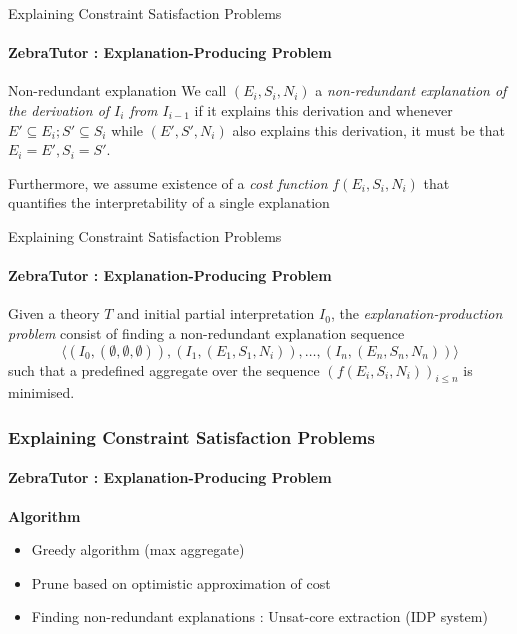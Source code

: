 \documentclass{beamer}
\begin{document}
\begin{frame}{\small{Explaining Constraint Satisfaction Problems}}
    \framesubtitle{ZebraTutor : Explanation-Producing Problem}
    \begin{block}{Non-redundant explanation}
        We call $(E_i,S_i,N_i)$ a \emph{non-redundant explanation of  the derivation of $I_i$ from $I_{i-1}$} if it explains this derivation and whenever $E'\subseteq E_i; S'\subseteq S_i$ while $(E',S',N_i)$ also explains this derivation, it must be that $E_i=E', S_i=S'$.
    \end{block}
    \pause
    Furthermore, we assume existence of a \emph{cost function} $f(E_i,S_i,N_i)$ that quantifies the interpretability of a single explanation
\end{frame}


\begin{frame}{\small{Explaining Constraint Satisfaction Problems}}
    \framesubtitle{ZebraTutor : Explanation-Producing Problem}
    \begin{definition}
        Given a theory $T$ and initial partial interpretation $I_0$, the \emph{explanation-production problem} consist of finding a non-redundant explanation sequence
        \[ \langle (I_0,(\emptyset,\emptyset,\emptyset)), (I_1,(E_1,S_1,N_i)), \dots ,(I_n,(E_n,S_n,N_n)) \rangle\]
        such that a predefined aggregate over the sequence $\left(f(E_i,S_i,N_i)\right)_{i\leq n}$ is minimised.
    \end{definition}
\end{frame}

\begin{frame}
    \frametitle{\small{Explaining Constraint Satisfaction Problems}}
    \framesubtitle{ZebraTutor : Explanation-Producing Problem}

    \textbf{Algorithm}
    \begin{itemize}
        \item Greedy algorithm (max aggregate)
        \item Prune based on optimistic approximation of cost
        \item Finding non-redundant explanations : Unsat-core extraction (IDP system)
    \end{itemize}

\end{frame}

\end{document}
